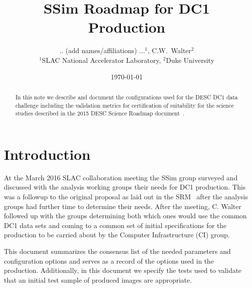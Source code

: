 \documentclass[12pt,letterpaper]{article}
\begin{document}

\title{SSim Roadmap for DC1 Production}
\author{ .. (add names/affiliations) ...$^1$, C.W.~Walter$^2$ \\
{\small $^1$SLAC National Accelerator Laboratory, $^2$Duke University}}

\date{\today}

\maketitle

\begin{abstract}
  In this note we describe and document the configurations used for
  the DESC DC1 data challenge including the validation metrics for
  certification of suitability for the science studies described in
  the 2015 DESC Science Roadmap document~\cite{SRM:2015}.
\end{abstract}

\noindent
\begin{center}
  \fboxsep=5pt  
  \end{center} 
\vspace{0.1in}

\section{Introduction}

At the March 2016 SLAC collaboration meeting the SSim group surveyed
and discussed with the analysis working groups their needs for DC1
production. This was a followup to the original proposal as laid out
in the SRM~\cite{SRM:2015} after the analysis groups had further time
to determine their needs.  After the meeting, C. Walter followed up
with the groups determining both which ones would use the common DC1
data sets and coming to a common set of initial specifications for the
production to be carried about by the Computer Infrastructure (CI)
group.

This document summarizes the consensus list of the needed parameters
and configuration options and serves as a record of the options used
in the production.  Additionally, in this document we specify the
tests used to validate that an initial test sample of produced images
are appropriate.
\end{document}
